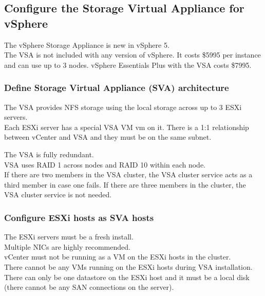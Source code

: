 \subsection{Configure the Storage Virtual Appliance for vSphere}

The vSphere Storage Appliance is new in vSphere 5.\\

The VSA is not included with any version of vSphere. It costs \$5995 per
instance and can use up to 3 nodes. vSphere Essentials Plus with the VSA
costs \$7995.

\subsubsection{Define Storage Virtual Appliance (SVA) architecture}

The VSA provides NFS storage using the local storage across up to 3 ESXi
servers.\\

Each ESXi server has a special VSA VM vm on it. There is a 1:1 relationship
between vCenter and VSA and they must be on the same subnet.

The VSA is fully redundant.\\

VSA uses RAID 1 across nodes and RAID 10 within each node.\\

If there are two members in the VSA cluster, the VSA cluster service acts
as a third member in case one fails. If there are three members in the cluster,
the VSA cluster service is not needed.

\subsubsection{Configure ESXi hosts as SVA hosts}

The ESXi servers must be a fresh install.\\

Multiple NICs are highly recommended.\\

vCenter must not be running as a VM on the ESXi hosts in the cluster.\\

There cannot be any VMs running on the ESXi hosts during VSA installation.\\

There can only be one datastore on the ESXi host and it must be a local disk
(there cannot be any SAN connections on the server).\\

